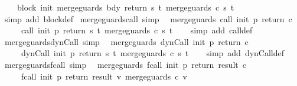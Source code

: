 \begin{isabellebody}
\ \ \ \ block\ init\ {\isacharparenleft}merge{\isacharunderscore}guards\ bdy{\isacharparenright}\ return\ {\isacharparenleft}{\isasymlambda}s\ t{\isachardot}\ merge{\isacharunderscore}guards\ {\isacharparenleft}c\ s\ t{\isacharparenright}{\isacharparenright}{\isachardoublequoteclose}\isanewline
%
\isadelimproof
\ \ %
\endisadelimproof
%
\isatagproof
{}\isamarkupfalse%
\ {\isacharparenleft}simp\ add{\isacharcolon}\ block{\isacharunderscore}def{\isacharparenright}%
\endisatagproof
{\isafoldproof}%
%
\isadelimproof
\isanewline
%
\endisadelimproof
\isanewline
{}\isamarkupfalse%
\ merge{\isacharunderscore}guards{\isacharunderscore}call\ {\isacharbrackleft}simp{\isacharbrackright}{\isacharcolon}\isanewline
\ \ {\isachardoublequoteopen}merge{\isacharunderscore}guards\ {\isacharparenleft}call\ init\ p\ return\ c{\isacharparenright}\ {\isacharequal}\isanewline
\ \ \ \ \ call\ init\ p\ return\ {\isacharparenleft}{\isasymlambda}s\ t{\isachardot}\ merge{\isacharunderscore}guards\ {\isacharparenleft}c\ s\ t{\isacharparenright}{\isacharparenright}{\isachardoublequoteclose}\isanewline
%
\isadelimproof
\ \ %
\endisadelimproof
%
\isatagproof
{}\isamarkupfalse%
\ {\isacharparenleft}simp\ add{\isacharcolon}\ call{\isacharunderscore}def{\isacharparenright}%
\endisatagproof
{\isafoldproof}%
%
\isadelimproof
\isanewline
%
\endisadelimproof
\isanewline
{}\isamarkupfalse%
\ merge{\isacharunderscore}guards{\isacharunderscore}dynCall\ {\isacharbrackleft}simp{\isacharbrackright}{\isacharcolon}\isanewline
\ \ {\isachardoublequoteopen}merge{\isacharunderscore}guards\ {\isacharparenleft}dynCall\ init\ p\ return\ c{\isacharparenright}\ {\isacharequal}\isanewline
\ \ \ \ \ dynCall\ init\ p\ return\ {\isacharparenleft}{\isasymlambda}s\ t{\isachardot}\ merge{\isacharunderscore}guards\ {\isacharparenleft}c\ s\ t{\isacharparenright}{\isacharparenright}{\isachardoublequoteclose}\isanewline
%
\isadelimproof
\ \ %
\endisadelimproof
%
\isatagproof
{}\isamarkupfalse%
\ {\isacharparenleft}simp\ add{\isacharcolon}\ dynCall{\isacharunderscore}def{\isacharparenright}%
\endisatagproof
{\isafoldproof}%
%
\isadelimproof
\isanewline
%
\endisadelimproof
\isanewline
{}\isamarkupfalse%
\ merge{\isacharunderscore}guards{\isacharunderscore}fcall\ {\isacharbrackleft}simp{\isacharbrackright}{\isacharcolon}\isanewline
\ \ {\isachardoublequoteopen}merge{\isacharunderscore}guards\ {\isacharparenleft}fcall\ init\ p\ return\ result\ c{\isacharparenright}\ {\isacharequal}\isanewline
\ \ \ \ \ fcall\ init\ p\ return\ result\ {\isacharparenleft}{\isasymlambda}v{\isachardot}\ merge{\isacharunderscore}guards\ {\isacharparenleft}c\ v{\isacharparenright}{\isacharparenright}{\isachardoublequoteclose}\isanewline

\end{isabellebody}
